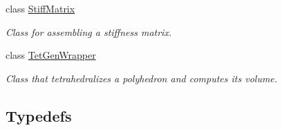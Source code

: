 \begin{DoxyCompactItemize}
class \hyperlink{classFVCode3D_1_1StiffMatrix}{Stiff\+Matrix}
\begin{DoxyCompactList}\small\item\em Class for assembling a stiffness matrix. \end{DoxyCompactList}\item 
class \hyperlink{classFVCode3D_1_1TetGenWrapper}{Tet\+Gen\+Wrapper}
\begin{DoxyCompactList}\small\item\em Class that tetrahedralizes a polyhedron and computes its volume. \end{DoxyCompactList}\end{DoxyCompactItemize}
\subsection*{Typedefs}
